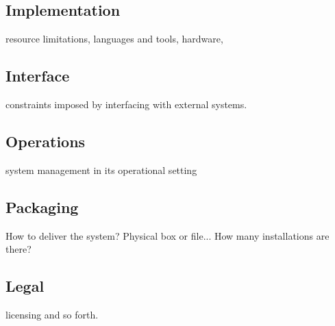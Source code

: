 \subsection{Implementation}
resource limitations, languages and tools, hardware,
\subsection{Interface}
constraints imposed by interfacing with external systems.
\subsection{Operations}
system management in its operational setting
\subsection{Packaging}
How to deliver the system? Physical box or file...
How many installations are there?
\subsection{Legal}
licensing and so forth.